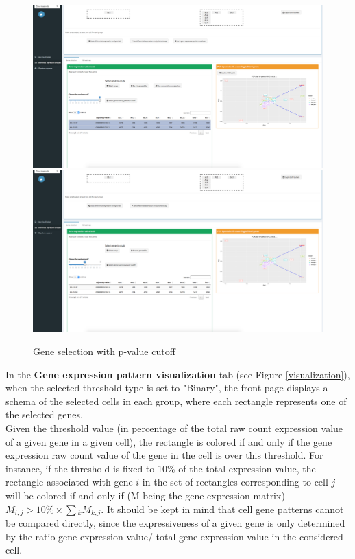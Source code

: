 \documentclass{report}
\begin{document}
{\begin{figure}[H]
\centering
\subfigure\includegraphics[scale=0.2]{application/selectpvaluecutoff.png}
\subfigure\includegraphics[scale=0.2]{application/selectpvaluecutoff2.png}
\caption{Gene selection with p-value cutoff}
\label{pcutoff}
\end{figure}

In the \textbf{Gene expression pattern visualization} tab (see Figure \ref{visualization}), when the selected threshold type is set to "Binary", the front page displays a schema of the selected cells in each group, where each rectangle represents one of the selected genes.\\

Given the threshold value (in percentage of the total raw count expression value of a given gene in a given cell), the rectangle is colored if and only if the gene expression raw count value of the gene in the cell is over this threshold. For instance, if the threshold is fixed to 10\% of the total expression value, the rectangle associated with gene $i$ in the set of rectangles corresponding to cell $j$ will be colored if and only if (M being the gene expression matrix) $M_{i,j} > 10\% \times \sum{_{k}}{M_{k, j}}$. It should be kept in mind that cell gene patterns cannot be compared directly, since the expressiveness of a given gene is only determined by the ratio gene expression value/ total gene expression value in the considered cell.\\

}
\end{document}
